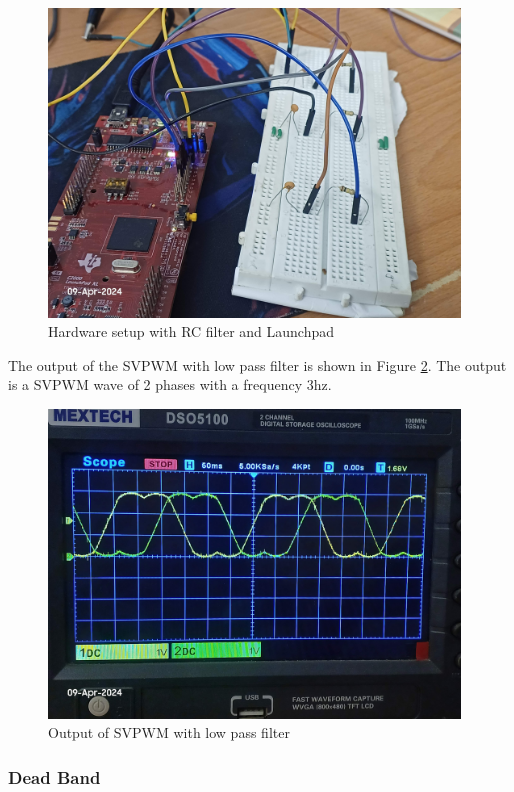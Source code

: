 \begin{figure}[H]
	\centering
	\includegraphics[width=4.3in]{sections/section6/images/SVPWM/LPFandC2000.jpg}
	\caption{Hardware setup with RC filter and Launchpad}
	\label{fig:hardwareSetupLPF}
\end{figure}

The output of the SVPWM with low pass filter is shown in Figure \ref{fig:OutputLPF}. The output is a SVPWM wave of 2 phases with a frequency 3hz.


\begin{figure}[H]
	\centering
	\includegraphics[width=4.3in]{sections/section6/images/SVPWM/SVPWM2phases.jpg}
	\caption{Output of SVPWM with low pass filter}
	\label{fig:OutputLPF}
\end{figure}


\subsubsection{Dead Band}

